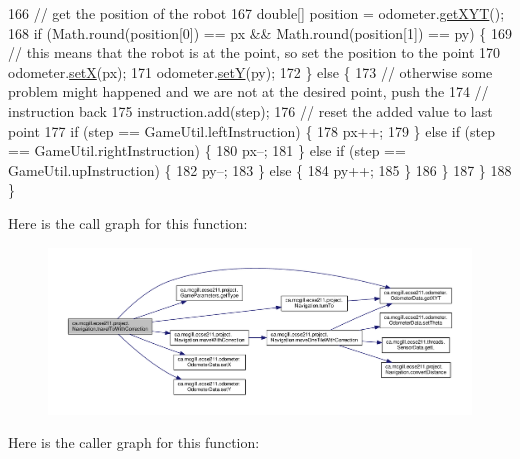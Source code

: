 \begin{DoxyCode}
166       \textcolor{comment}{// get the position of the robot}
167       \textcolor{keywordtype}{double}[] position = odometer.\hyperlink{classca_1_1mcgill_1_1ecse211_1_1odometer_1_1_odometer_data_a8f40f0264c68f0cbed4fff1723ae7863}{getXYT}();
168       \textcolor{keywordflow}{if} (Math.round(position[0]) == px && Math.round(position[1]) == py) \{
169         \textcolor{comment}{// this means that the robot is at the point, so set the position to the point}
170         odometer.\hyperlink{classca_1_1mcgill_1_1ecse211_1_1odometer_1_1_odometer_data_a2911d7215e47f3064defe016b46bfeef}{setX}(px);
171         odometer.\hyperlink{classca_1_1mcgill_1_1ecse211_1_1odometer_1_1_odometer_data_a82986438cd462e66520bc62bb4bd2b75}{setY}(py);
172       \} \textcolor{keywordflow}{else} \{
173         \textcolor{comment}{// otherwise some problem might happened and we are not at the desired point, push the}
174         \textcolor{comment}{// instruction back}
175         instruction.add(step);
176         \textcolor{comment}{// reset the added value to last point}
177         \textcolor{keywordflow}{if} (step == GameUtil.leftInstruction) \{
178           px++;
179         \} \textcolor{keywordflow}{else} \textcolor{keywordflow}{if} (step == GameUtil.rightInstruction) \{
180           px--;
181         \} \textcolor{keywordflow}{else} \textcolor{keywordflow}{if} (step == GameUtil.upInstruction) \{
182           py--;
183         \} \textcolor{keywordflow}{else} \{
184           py++;
185         \}
186       \}
187     \}
188   \}
\end{DoxyCode}
Here is the call graph for this function\+:\nopagebreak
\begin{figure}[H]
\begin{center}
\leavevmode
\includegraphics[width=350pt]{classca_1_1mcgill_1_1ecse211_1_1project_1_1_navigation_ae7230e905494002087416294f12cae6a_cgraph}
\end{center}
\end{figure}
Here is the caller graph for this function\+:\nopagebreak
